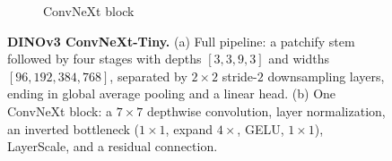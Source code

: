 \begin{figure}[H]
\begin{subfigure}[b]{0.46\textwidth}
\caption{ConvNeXt block}
\label{fig:cnn_block}
\end{subfigure}
\caption{\textbf{DINOv3 ConvNeXt-Tiny.} (a) Full pipeline: a patchify stem followed by four
stages with depths $[3,3,9,3]$ and widths $[96,192,384,768]$, separated by $2\times2$ stride-$2$
downsampling layers, ending in global average pooling and a linear head. (b) One ConvNeXt block:
a $7\times7$ depthwise convolution, layer normalization, an inverted bottleneck ($1\times1$,
expand $4\times$, GELU, $1\times1$), LayerScale, and a residual connection.}
\label{fig:cnn_arch}
\end{figure}
